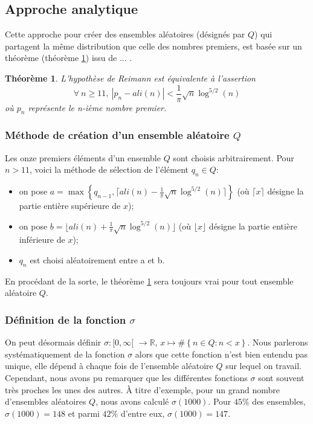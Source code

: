 \documentclass[../main.tex]{report}
\begin{document}
\theoremstyle{plain}
\newtheorem{Thm}{Théorème}

\subsection{Approche analytique}

Cette approche pour créer des ensembles aléatoires (désignés par $Q$) qui partagent la même distribution que celle des nombres
premiers, est basée sur un théorème (théorème \ref{theorem}) issu de ... . 

\begin{Thm}
\label{theorem}
	L'hypothèse de Reimann est équivalente à l'assertion 
	\[
	\forall \ n \geqslant 11, \ |p_{n} - ali(n) | < \frac{1}{\pi} \sqrt{n} \log^{5/2}(n) 
	\]
	où $p_{n}$ représente le n-ième nombre premier.
\end{Thm}

\subsubsection{Méthode de création d'un ensemble aléatoire $Q$}

Les onze premiers éléments d'un ensemble $Q$ sont choisis arbitrairement. 
Pour $ n > 11 $, voici la méthode de sélection  de l'élément $q_{n} \in Q$: 
\begin{itemize}
	\item on pose $ a = \max \left\{ q_{n-1} ,\lceil{ali(n) - \frac{1}{\pi} \sqrt{n} \log^{5/2}(n) \rceil} \right\}$ 
	(où $\lceil x \rceil$ désigne la partie entière supérieure de $x$);
	\item on pose $ b = \lfloor ali(n) + \frac{1}{\pi} \sqrt{n} \log^{5/2}(n) \rfloor $
	(où $\lfloor x \rfloor$ désigne la partie entière inférieure de $x$);
	\item $ q_{n} $ est choisi aléatoirement entre a et b. 
\end{itemize}
En procédant de la sorte, le théorème \ref{theorem} sera toujours vrai pour tout ensemble aléatoire $Q$.

\subsubsection{Définition de la fonction $\sigma$}

On peut désormais définir $ \sigma : [0, \infty [$  $\rightarrow \mathbb{R} $, $ x \mapsto \# \left\{ n \in Q : n < x \right\} $. Nous parlerons systématiquement de  la fonction $\sigma$ alors que cette fonction n'est bien entendu pas unique, elle dépend à chaque fois de l'ensemble aléatoire $Q$ sur lequel on travail. Cependant, nous avons pu remarquer que  les différentes fonctions $\sigma$ sont souvent très proches les unes des autres. À titre d'exemple,  pour un grand nombre d'ensembles aléatoires $Q$, nous avons calculé $\sigma(1000)$. Pour $45 \%$ des ensembles, $\sigma(1000) = 148$ et parmi $42\%$ d'entre eux, $\sigma(1000) = 147$.
\end{document}

